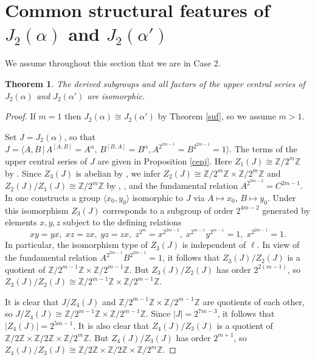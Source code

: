 \documentclass{amsart}
\newtheorem{theorem}{Theorem}[section]
\theoremstyle{definition}
\theoremstyle{remark}
\newcommand \Z{{\mathbb Z}}
\begin{document}
\section{Common structural features of $J_2(\alpha)$ and $J_2(\alpha')$}

We assume throughout this section that we are in Case 2.

\begin{theorem}\label{csf2} The derived subgroups and all factors of the upper central series of $J_2(\alpha)$ and $J_2(\alpha')$ are isomorphic.
\end{theorem}

\begin{proof} If $m=1$ then $J_2(\alpha)\cong J_2(\alpha')$ by Theorem \ref{suf}, so we assume $m>1$.

Set $J=J_2(\alpha)$, so that
$J=\langle A,B\,|\, A^{[A,B]}=A^{\alpha},\, B^{[B,A]}=B^{\alpha}, A^{2^{2m-1}}=B^{2^{2m-1}}=1\rangle$. The terms
of the upper central series of $J$ are given in Proposition \ref{cenj}. Here $Z_1(J)\cong\Z/2^m\Z$ by
\cite[Proposition 7.2]{MS}. Since $Z_3(J)$ is abelian by \cite[Proposition 9.2]{MS}, we infer
$Z_2(J)\cong\Z/2^m\Z\times \Z/2^m\Z$ and $Z_2(J)/Z_1(J)\cong\Z/2^m\Z$ by \cite[Theorem 7.1]{MS},
\cite[Proposition 7.2]{MS}, and the fundamental relation $A^{2^{3m-2}}=C^{2m-1}$. In \cite[Theorem 11.2]{MS} one constructs a
group $\langle x_0,y_0\rangle$ isomorphic to $J$ via $A\mapsto x_0$, $B\mapsto y_0$. Under this isomorphism
$Z_3(J)$ corresponds to a subgroup of order $2^{4m-2}$ generated by elements $x,y,z$ subject to the
defining relations
\[
    xy=yx,\;
    xz=zx,\;
    yz=zx,\;
    z^{2^m}=x^{2^{2m-2}},\;
    x^{2^{m-1}}y^{2^{m-1}}=1,\;
    x^{2^{2m-1}}=1.
    \]
In particular, the isomorphism type of $Z_3(J)$ is independent of $\ell$. In view of the fundamental
relation $A^{2^{2m-1}}B^{2^{2m-1}}=1$, it follows that $Z_3(J)/Z_2(J)$ is a quotient of $\Z/2^{m-1}\Z\times \Z/2^{m-1}\Z$.
But $Z_3(J)/Z_2(J)$ has order $2^{2(m-1)}$, so $Z_3(J)/Z_2(J)\cong \Z/2^{m-1}\Z\times \Z/2^{m-1}\Z$.

It is clear that $J/Z_4(J)$ and $\Z/2^{m-1}\Z\times \Z/2^{m-1}\Z$ are quotients of each other, so
$J/Z_4(J)\cong\Z/2^{m-1}\Z\times \Z/2^{m-1}\Z$. Since $|J|=2^{7m-3}$, it follows that $|Z_4(J)|=2^{5m-1}$.
It is also clear that $Z_4(J)/Z_3(J)$ is a quotient of $\Z/2\Z\times\Z/2\Z\times\Z/2^m\Z$.
But $Z_4(J)/Z_3(J)$ has order $2^{m+1}$, so $Z_4(J)/Z_3(J)\cong \Z/2\Z\times\Z/2\Z\times\Z/2^m\Z$.


\end{proof}
\end{document}
